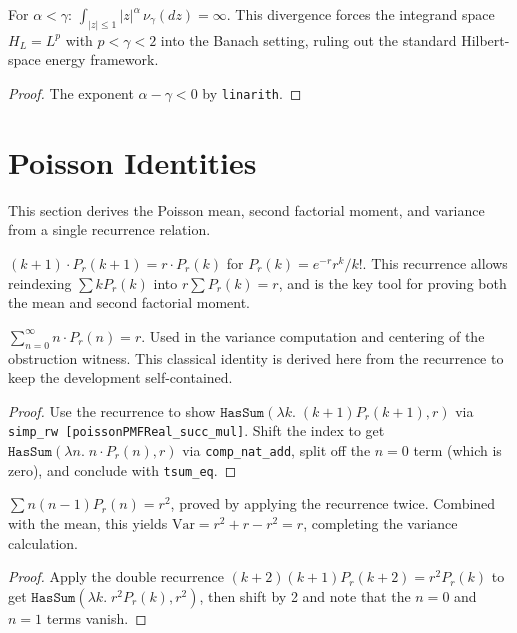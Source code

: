 \begin{theorem}\label{thm:small_jump_diverges}
\leanok
For $\alpha < \gamma$: $\int_{|z|\leq 1} |z|^\alpha\,\nu_\gamma(dz) = \infty$.
This divergence forces the integrand space $H_L = L^p$ with $p < \gamma < 2$ into the Banach setting,
ruling out the standard Hilbert-space energy framework.
\end{theorem}
\begin{proof}\leanok The exponent $\alpha - \gamma < 0$ by \texttt{linarith}.\end{proof}

\section{Poisson Identities}

This section derives the Poisson mean, second factorial moment, and variance from a single recurrence relation.

\begin{defn}\label{lem:poisson_recurrence}
\leanok
$(k+1) \cdot P_r(k+1) = r \cdot P_r(k)$ for $P_r(k) = e^{-r} r^k / k!$.
This recurrence allows reindexing $\sum k P_r(k)$ into $r \sum P_r(k) = r$,
and is the key tool for proving both the mean and second factorial moment.
\end{defn}

\begin{theorem}\label{thm:poisson_mean}
\leanok
{}
$\sum_{n=0}^{\infty} n \cdot P_r(n) = r$.
Used in the variance computation and centering of the obstruction witness.
This classical identity is derived here from the recurrence to keep the development self-contained.
\end{theorem}
\begin{proof}\leanok
Use the recurrence to show $\texttt{HasSum}(\lambda k.\; (k+1)P_r(k+1), r)$
via \texttt{simp\_rw [poissonPMFReal\_succ\_mul]}. Shift the index to get
$\texttt{HasSum}(\lambda n.\; n \cdot P_r(n), r)$ via \texttt{comp\_nat\_add},
split off the $n=0$ term (which is zero), and conclude with \texttt{tsum\_eq}.
\end{proof}

\begin{theorem}\label{thm:poisson_second_fact}
\leanok
{}
$\sum n(n-1) P_r(n) = r^2$, proved by applying the recurrence twice.
Combined with the mean, this yields $\mathrm{Var} = r^2 + r - r^2 = r$, completing the variance calculation.
\end{theorem}
\begin{proof}\leanok
Apply the double recurrence $(k+2)(k+1)P_r(k+2) = r^2 P_r(k)$ to get
$\texttt{HasSum}(\lambda k.\; r^2 P_r(k), r^2)$, then shift by 2 and note
that the $n=0$ and $n=1$ terms vanish.
\end{proof}

